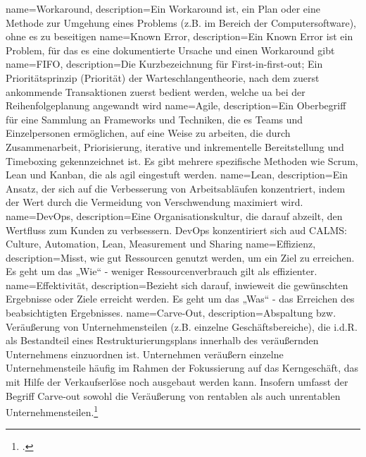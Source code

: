 {
    name=Workaround,
    description={Ein Workaround ist, ein Plan oder eine Methode zur Umgehung eines Problems (z.B. im Bereich der Computersoftware), ohne es zu beseitigen}
}
{
    name=Known Error,
    description={Ein Known Error ist ein Problem, für das es eine dokumentierte Ursache und einen Workaround gibt}
}
{
    name=FIFO,
    description={Die Kurzbezeichnung für First-in-first-out; Ein Prioritätsprinzip (Priorität) der Warteschlangentheorie, nach dem zuerst ankommende Transaktionen zuerst bedient werden, welche \ac{ua} bei der Reihenfolgeplanung angewandt wird}
}
{
    name=Agile,
    description={Ein Oberbegriff für eine Sammlung an Frameworks und Techniken, die es Teams und Einzelpersonen ermöglichen, auf eine Weise zu arbeiten, die durch Zusammenarbeit, Priorisierung, iterative und inkrementelle Bereitstellung und Timeboxing gekennzeichnet ist. Es gibt mehrere spezifische Methoden wie Scrum, Lean und Kanban, die als agil eingestuft werden.}
}
{
    name=Lean,
    description={Ein Ansatz, der sich auf die Verbesserung von Arbeitsabläufen konzentriert, indem der Wert durch die Vermeidung von Verschwendung maximiert wird.}
}
{
    name=DevOps,
    description={Eine Organisationskultur, die darauf abzeilt, den Wertfluss zum Kunden zu verbsessern. DevOps konzentiriert sich aud CALMS: Culture, Automation, Lean, Measurement und Sharing}
}
{
    name=Effizienz,
    description={Misst, wie gut Ressourcen genutzt werden, um ein Ziel zu erreichen. Es geht um das „Wie“ - weniger Ressourcenverbrauch gilt als effizienter.}
}
{
    name=Effektivität,
    description={Bezieht sich darauf, inwieweit die gewünschten Ergebnisse oder Ziele erreicht werden. Es geht um das „Was“ - das Erreichen des beabsichtigten Ergebnisses.}
}
{
	name=Carve-Out,
	description={Abspaltung bzw. Veräußerung von Unternehmensteilen (z.B. einzelne Geschäftsbereiche), die i.d.R. als Bestandteil eines Restrukturierungsplans innerhalb des veräußernden Unternehmens einzuordnen ist. Unternehmen veräußern einzelne Unternehmensteile häufig im Rahmen der Fokussierung auf das Kerngeschäft, das mit Hilfe der Verkaufserlöse noch ausgebaut werden kann. Insofern umfasst der Begriff Carve-out sowohl die Veräußerung von rentablen als auch unrentablen Unternehmensteilen.\footcite{Dr.SteffenHundtDCO}}
}
